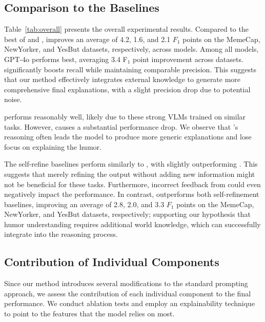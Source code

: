 \subsection{Comparison to the Baselines}
\label{sec:results:rq1}
Table~\ref{tab:overall} presents the overall experimental results. Compared to the best of \base{} and \chain{}, \method{} improves an average of 4.2, 1.6, and 2.1 $F_1$ points on the MemeCap, NewYorker, and YesBut datasets, respectively, across models. Among all models, GPT-4o performs best, averaging 3.4 F$_1$ point improvement across datasets. 
\method{} significantly boosts recall while maintaining comparable precision. This suggests that our method effectively integrates external knowledge to generate more comprehensive final explanations, with a slight precision drop due to potential noise.

\base{} performs reasonably well, likely due to these strong VLMs trained on similar tasks. However, \chain{} causes a substantial performance drop. We observe that \chain{}'s reasoning often leads the model to produce more generic explanations and lose focus on explaining the humor.

The self-refine baselines perform similarly to \base{}, with \critic{} slightly outperforming \nocritic{}. This suggests that merely refining the output without adding new information might not be beneficial for these tasks. Furthermore, incorrect feedback from \critic{} could even negatively impact the performance.  
In contrast, \method{} outperforms both self-refinement baselines, improving an average of 2.8, 2.0, and 3.3 $F_1$ points on the MemeCap, NewYorker, and YesBut datasets, respectively; supporting our hypothesis that humor understanding requires additional world knowledge, which \method{} can successfully integrate into the reasoning process.

\subsection{Contribution of Individual Components} 
\label{sec:results:rq2}

Since our method introduces several modifications to the standard prompting approach, we assess the contribution of each individual component to the final performance. We conduct ablation tests and employ an explainability technique to point to the features that the model relies on most. 

